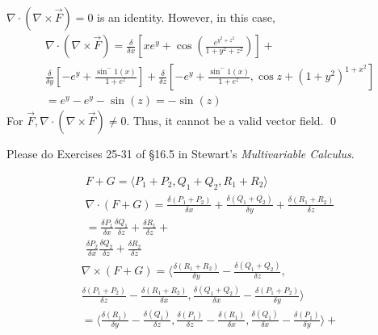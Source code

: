 \documentclass[12pt]{exam}
\begin{document}
\begin{questions}
\begin{solution}
        $\nabla \cdot (\nabla \times \overrightarrow{F}) = 0$ is an identity. However, in this case, 
        \begin{gather*}
            \nabla \cdot (\nabla \times \overrightarrow{F}) = \frac{\delta }{\delta x} \left[xe^y + \cos\left(\frac{e^{y^2 + z^2}}{1 + y^2 + z^2}\right)\right] + \\ \frac{\delta }{\delta y}\left[-e^y + \frac{\sin^-1(x)}{1+e^z}\right] + \frac{\delta }{\delta z}\left[-e^y + \frac{\sin^-1(x)}{1+e^z}, \cos z + (1 + y^2)^{1+x^2}\right] \\
            = e^y - e^y - \sin(z) = -\sin(z)
        \end{gather*}
        For $\overrightarrow{F}, \nabla \cdot (\nabla \times \overrightarrow{F}) \neq 0$. Thus, it cannot be a valid vector field. \qed
    \end{solution}
    \clearpage
\question Please do Exercises 25-31 of §16.5 in Stewart's \textit{Multivariable Calculus}.
    \begin{solution}
        \begin{questions}
            \setcounter{question}{24}
            \question 
                \begin{gather*}
                    F+G = \langle P_1 + P_2, Q_1 + Q_2, R_1 + R_2 \rangle \\
                    \nabla \cdot (F+G) = \frac{\delta (P_1 + P_2)}{\delta x} + \frac{\delta (Q_1 + Q_2)}{\delta y} + \frac{\delta (R_1 + R_2)}{\delta z} \\
                    = \frac{\delta P_1}{\delta x} \frac{\delta Q_1}{\delta z} + \frac{\delta R_1}{\delta z} + \\ \frac{\delta P_2}{\delta x} \frac{\delta Q_2}{\delta z} + \frac{\delta R_2}{\delta z}
                \end{gather*}
            \question 
                \begin{gather*}
                    \nabla \times (F+G) = \langle \frac{\delta (R_1 + R_2)}{\delta y} - \frac{\delta (Q_1 + Q_2)}{\delta z},\\ \frac{\delta (P_1 + P_2)}{\delta z} - \frac{\delta (R_1 + R_2)}{\delta x}, \frac{\delta (Q_1 + Q_2)}{\delta x} - \frac{\delta (P_1 + P_2)}{\delta y} \rangle \\
                    = \langle \frac{\delta (R_1)}{\delta y} - \frac{\delta (Q_1)}{\delta z}, \frac{\delta (P_1)}{\delta z} - \frac{\delta (R_1)}{\delta x}, \frac{\delta (Q_1 )}{\delta x} - \frac{\delta (P_1)}{\delta y} \rangle + \\

\end{gather*}
\end{questions}
\end{solution}
\end{questions}
\end{document}
